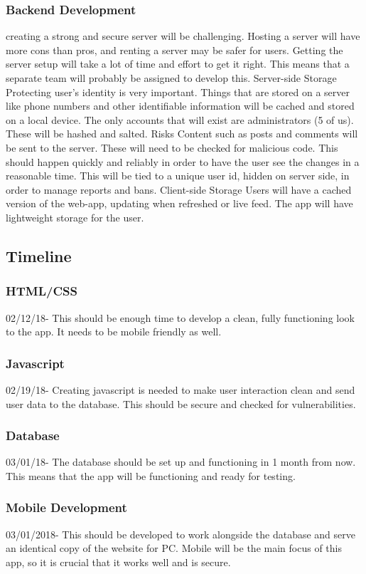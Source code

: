 \documentclass[12pt]{article}
\begin{document}
\subsubsection{Backend Development}
	creating a strong and secure server will be challenging. Hosting a server will have more cons than pros, and renting a server may be safer for users. Getting the server setup will take a lot of time and effort to get it right. This means that a separate team will probably be assigned to 	develop this.
Server-side Storage
	Protecting user’s identity is very important. Things that are stored on a server like phone 	numbers and other identifiable information will be cached and stored on a local device. The 	only accounts that will exist are administrators (5 of us). These will be hashed and salted.
Risks
	Content such as posts and comments will be sent to the server. These will need to be checked for malicious code. This should happen quickly and reliably in order to have the user see the changes in a reasonable time. This will be tied to a unique user id, hidden on server side, in 	order to manage reports and bans.
Client-side Storage
	Users will have a cached version of the web-app, updating when refreshed or live feed. The app will have lightweight storage for the user.

\subsection{Timeline}
\subsubsection{HTML/CSS}
	02/12/18- This should be enough time to develop a clean, fully functioning look to the app. It needs to be mobile friendly as well.
\subsubsection{Javascript}
	02/19/18- Creating javascript is needed to make user interaction clean and send user data to the 	database. This should be secure and checked for vulnerabilities.
\subsubsection{Database}
	03/01/18- The database should be set up and functioning in 1 month from now. This means that 	the app will be functioning and ready for testing.
\subsubsection{Mobile Development}
	03/01/2018- This should be developed to work alongside the database and serve an identical 	copy of the website for PC. Mobile will be the main focus of this app, so it is crucial that it 	works well and is secure.
\end{document}
